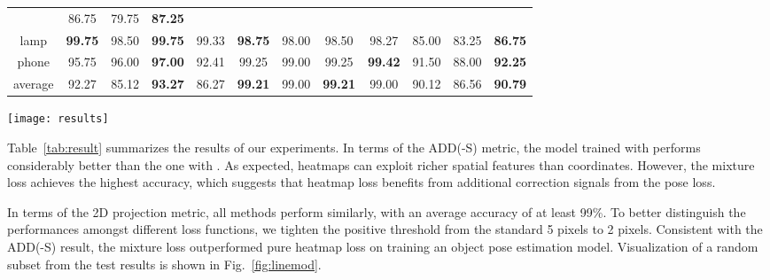 \documentclass[10pt,twocolumn,letterpaper]{article}
\begin{document}
\begin{table*}
\begin{center}
\begin{tabular}{|c|cccc|cccc|ccc|}
& 86.75 & 79.75 & \textbf{87.25} 
\\
lamp&\textbf{99.75}&98.50&\textbf{99.75}&99.33
&\textbf{98.75}&98.00&98.50&98.27
& 85.00 & 83.25 & \textbf{86.75} 
\\
phone&95.75&96.00&\textbf{97.00}&92.41
&99.25&99.00&99.25&\textbf{99.42}
& 91.50 & 88.00 & \textbf{92.25} \\
\hline
average&92.27&85.12&\textbf{93.27}&86.27
&\textbf{99.21}&99.00&\textbf{99.21}&99.00
& 90.12 & 86.56 & \textbf{90.79} 
\\
\hline
 \end{tabular}
\end{center}
\caption{
Test accuracy on the LINEMOD dataset in terms of the ADD(-S) metric (columns 2-5) and the 2D projection metric with  pixels (columns 6-9) and  pixels (columns 10-12). Objects eggbox and glue are considered as symmetric objects and the ADD-S metric is used. }
\label{tab:result}
\end{table*}

\begin{figure*}\centering
    \texttt{[image: results]}
    \caption{Random sample of test results of the proposed model trained with the mixture loss . The first row are the test images for predicting the pose of the central object. The second row shows the regressed alignment for each query object. }
\label{fig:linemod}
\end{figure*}

Table~\ref{tab:result} summarizes the results of our experiments. In terms of the ADD(-S) metric, the model trained with  performs considerably better than the one with . As expected, heatmaps can exploit richer spatial features than coordinates. However, the mixture loss achieves the highest accuracy, which suggests that heatmap loss benefits from additional correction signals from the pose loss. 





In terms of the 2D projection metric, all methods perform similarly, with an average accuracy of at least 99\%.  To better distinguish the performances amongst different loss functions, we tighten the positive threshold  from the standard 5 pixels to 2 pixels. Consistent with the ADD(-S) result,  the mixture loss outperformed pure heatmap loss on training an object pose estimation model. Visualization of a random subset from the test results is shown in Fig.~\ref{fig:linemod}.
\end{document}
